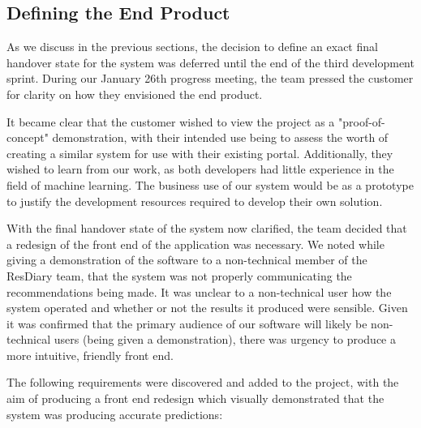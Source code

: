 \documentclass{l3proj}
\begin{document}

\newpage
\subsection{Defining the End Product}
\label{sec:jandefinedstate}

As we discuss in the previous sections, the decision to define an exact final handover state for the system was deferred until the end of the third development sprint. During our January 26th progress meeting, the team pressed the customer for clarity on how they envisioned the end product. 

It became clear that the customer wished to view the project as a "proof-of-concept" demonstration, with their intended use being to assess the worth of creating a similar system for use with their existing portal. Additionally, they wished to learn from our work, as both developers had little experience in the field of machine learning. The business use of our system would be as a prototype to justify the development resources required to develop their own solution.

With the final handover state of the system now clarified, the team decided that a redesign of the front end of the application was necessary. We noted while giving a demonstration of the software to a non-technical member of the ResDiary team, that the system was not properly communicating the recommendations being made. It was unclear to a non-technical user how the system operated and whether or not the results it produced were sensible. Given it was confirmed that the primary audience of our software will likely be non-technical users (being given a demonstration), there was urgency to produce a more intuitive, friendly front end. 

The following requirements were discovered and added to the project, with the aim of producing a front end redesign which visually demonstrated that the system was producing accurate predictions:
\end{document}
